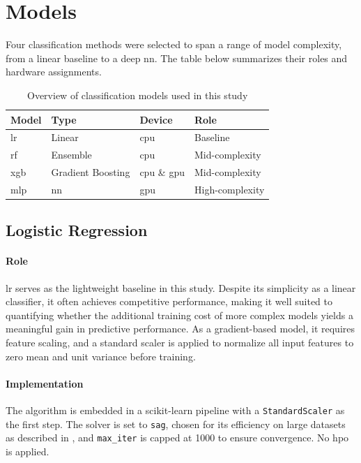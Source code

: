 \section{Models}
\label{design_models}

Four classification methods were selected to span a range of model complexity, from a linear baseline to a deep \gls{nn}. The table below summarizes their roles and hardware assignments.

\begin{table}[htbp]
\centering
\caption{Overview of classification models used in this study}
\label{tab:models}
\begin{tabular}{llll}
\toprule
\textbf{Model} & \textbf{Type} & \textbf{Device} & \textbf{Role} \\
\midrule
\gls{lr} & Linear & \gls{cpu} & Baseline \\
\gls{rf}  & Ensemble & \gls{cpu} & Mid-complexity \\
\gls{xgb} & Gradient Boosting & \gls{cpu} \& \gls{gpu} & Mid-complexity \\
\gls{mlp} & \gls{nn} & \gls{gpu} & High-complexity \\
\bottomrule
\end{tabular}
\end{table}

\subsection{Logistic Regression}
\label{implementation_lr}

\paragraph{Role}
\gls{lr} serves as the lightweight baseline in this study. Despite its simplicity as a linear classifier, it often achieves competitive performance, making it well suited to quantifying whether the additional training cost of more complex models yields a meaningful gain in predictive performance. As a gradient-based model, it requires feature scaling, and a standard scaler is applied to normalize all input features to zero mean and unit variance before training.

\paragraph{Implementation}
The algorithm is embedded in a scikit-learn pipeline with a \texttt{Standard\-Scaler} as the first step. The solver is set to \texttt{sag}, chosen for its efficiency on large datasets as described in , and \texttt{max\_iter} is capped at 1000 to ensure convergence. No \gls{hpo} is applied.

